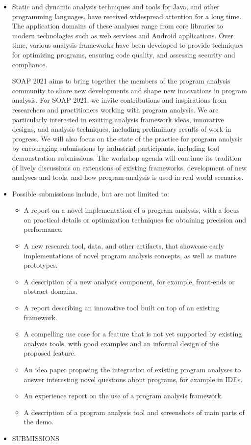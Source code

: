 \documentclass[prodmode,acmtecs]{acmsmall} %
\begin{document}
\begin{itemize}\item  Static and dynamic analysis techniques and tools for Java, and other programming languages, have received widespread attention for a long time. The application domains of these analyses range from core libraries to modern technologies such as web services and Android applications. Over time, various analysis frameworks have been developed to provide techniques for optimizing programs, ensuring code quality, and assessing security and compliance. 
 
  SOAP 2021 aims to bring together the members of the program analysis community to share new developments and shape new innovations in program analysis. For SOAP 2021, we invite contributions and inspirations from researchers and practitioners working with program analysis. We are particularly interested in exciting analysis framework ideas, innovative designs, and analysis techniques, including preliminary results of work in progress. We will also focus on the state of the practice for program analysis by encouraging submissions by industrial participants, including tool demonstration submissions. The workshop agenda will continue its tradition of lively discussions on extensions of existing frameworks, development of new analyses and tools, and how program analysis is used in real-world scenarios. 
 
\item  Possible submissions include, but are not limited to: 
 
\begin{itemize}\item  A report on a novel implementation of a program analysis, with a focus on practical details or optimization techniques for obtaining precision and performance.
\item  A new research tool, data, and other artifacts, that showcase early implementations of novel program analysis concepts, as well as mature prototypes.
\item  A description of a new analysis component, for example, front-ends or abstract domains.
\item  A report describing an innovative tool built on top of an existing framework.
\item  A compelling use case for a feature that is not yet supported by existing analysis tools, with good examples and an informal design of the proposed feature.
\item  An idea paper proposing the integration of existing program analyses to answer interesting novel questions about programs, for example in IDEs.
\item  An experience report on the use of a program analysis framework.
\item  A description of a program analysis tool and screenshots of main parts of the demo.
\end{itemize} 
\item  SUBMISSIONS  
 

\end{itemize}
\end{document}
